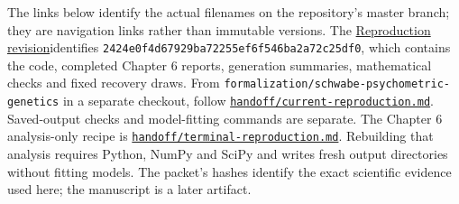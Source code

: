 \documentclass[11pt]{article}
\begin{document}
The links below identify the actual filenames on the repository's master branch; they are navigation links rather than immutable versions. The \href{https://github.com/alectionary/vibe-math/commit/2424e0f4d67929ba72255ef6f546ba2a72c25df0}{Reproduction revision}\quad identifies \nolinkurl{2424e0f4d67929ba72255ef6f546ba2a72c25df0}, which contains the code, completed Chapter 6 reports, generation summaries, mathematical checks and fixed recovery draws. From \nolinkurl{formalization/schwabe-psychometric-genetics} in a separate checkout, follow \href{https://github.com/alectionary/vibe-math/blob/master/formalization/schwabe-psychometric-genetics/handoff/current-reproduction.md}{\nolinkurl{handoff/current-reproduction.md}}. Saved-output checks and model-fitting commands are separate. The Chapter 6 analysis-only recipe is \href{https://github.com/alectionary/vibe-math/blob/master/formalization/schwabe-psychometric-genetics/handoff/terminal-reproduction.md}{\nolinkurl{handoff/terminal-reproduction.md}}. Rebuilding that analysis requires Python, NumPy and SciPy and writes fresh output directories without fitting models. The packet's hashes identify the exact scientific evidence used here; the manuscript is a later artifact.
\end{document}
